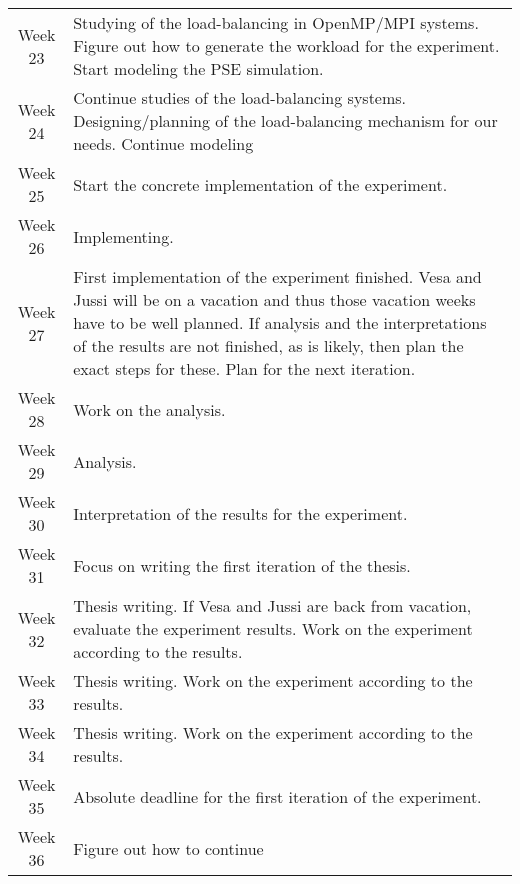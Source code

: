 \begin{table}[h]
  \centering
  \begin{tabular}{@{}c|p{10cm}@{}}
    \toprule
    Week 23 & Studying of the load-balancing in OpenMP/MPI systems. Figure out how to generate the workload for the experiment. Start modeling the PSE simulation. \\
    Week 24 & Continue studies of the load-balancing systems. Designing/planning of the load-balancing mechanism for our needs. Continue modeling \\
    Week 25 & Start the concrete implementation of the experiment. \\
    Week 26 & Implementing. \\
    Week 27 & First implementation of the experiment finished. Vesa and Jussi will be on a vacation and thus those vacation weeks have to be well planned. If analysis and the interpretations of the results are not finished, as is likely, then plan the exact steps for these. Plan for the next iteration. \\
    Week 28 & Work on the analysis. \\
    Week 29 & Analysis. \\
    Week 30 & Interpretation of the results for the experiment. \\
    Week 31 & Focus on writing the first iteration of the thesis. \\
    Week 32 & Thesis writing. If Vesa and Jussi are back from vacation, evaluate the experiment results. Work on the experiment according to the results. \\
    Week 33 & Thesis writing. Work on the experiment according to the results. \\
    Week 34 & Thesis writing. Work on the experiment according to the results. \\
    Week 35 & Absolute deadline for the first iteration of the experiment.  \\
    Week 36 & Figure out how to continue \\

    \bottomrule
  \end{tabular}
\end{table}

